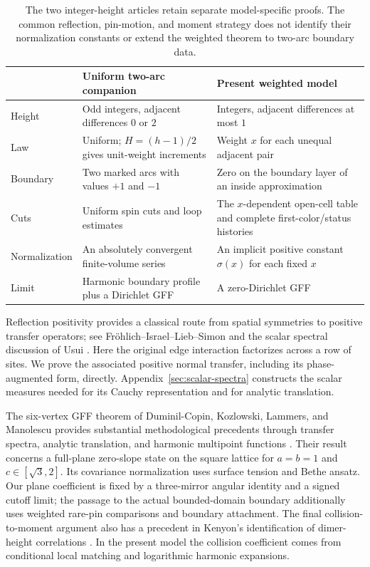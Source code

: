 \begin{table}[!htbp]
\centering
\small
\renewcommand{\arraystretch}{1.22}
\begin{tabular}{p{}p{}p{}}
\hline
 & Uniform two-arc companion & Present weighted model \\
\hline
Height & Odd integers, adjacent differences $0$ or $2$ &
Integers, adjacent differences at most $1$ \\
Law & Uniform; $H=(h-1)/2$ gives unit-weight increments &
Weight $x$ for each unequal adjacent pair \\
Boundary & Two marked arcs with values $+1$ and $-1$ &
Zero on the boundary layer of an inside approximation \\
Cuts & Uniform spin cuts and loop estimates &
The $x$-dependent open-cell table and complete first-color/status histories \\
Normalization & An absolutely convergent finite-volume series &
An implicit positive constant $\sigma(x)$ for each fixed $x$ \\
Limit & Harmonic boundary profile plus a Dirichlet GFF &
A zero-Dirichlet GFF \\
\hline
\end{tabular}
\caption{The two integer-height articles retain separate model-specific
proofs.  The common reflection, pin-motion, and moment strategy does not
identify their normalization constants or extend the weighted theorem
to two-arc boundary data.}
\label{tab:integer-models}
\end{table}
\FloatBarrier

Reflection positivity provides a classical route from spatial symmetries
to positive transfer operators; see Fr\"ohlich--Israel--Lieb--Simon
\cite{FILS1978} and the scalar spectral discussion of Usui
\cite[Sections~3--4]{Usui2012}.  Here the original edge interaction
factorizes across a row of sites.  We prove the associated positive
normal transfer, including its phase-augmented form, directly.
Appendix~\ref{sec:scalar-spectra} constructs the scalar measures needed
for its Cauchy representation and for analytic translation.

The six-vertex GFF theorem of Duminil-Copin, Kozlowski, Lammers, and
Manolescu provides substantial methodological precedents through transfer
spectra, analytic translation, and harmonic multipoint functions
\cite[Section~4.5; Lemma~7.4; Section~7.2]{DCKLM2026}.  Their result concerns a
full-plane zero-slope state on the square lattice for
$a=b=1$ and $c\in[\sqrt3,2]$.  Its covariance normalization uses
surface tension and Bethe ansatz.  Our plane coefficient is fixed by a
three-mirror angular identity and a signed cutoff limit; the passage to
the actual bounded-domain boundary additionally uses weighted rare-pin
comparisons and boundary attachment.  The final collision-to-moment
argument also has a precedent in Kenyon's identification of dimer-height
correlations \cite[Lemma~3.1 and Proposition~3.2]{Kenyon2001}.  In the present model the
collision coefficient comes from conditional local matching and
logarithmic harmonic expansions.


